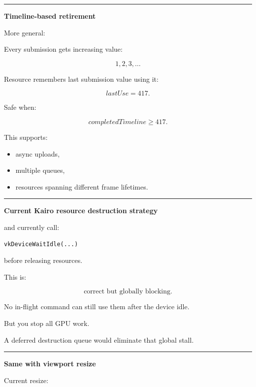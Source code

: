 \begin{center}\rule{0.5\linewidth}{0.5pt}\end{center}

\textbf{Timeline-based retirement}

More general:

Every submission gets increasing value:

\[
1,2,3,\dots
\]

Resource remembers last submission value using it:

\[
lastUse=417.
\]

Safe when:

\[
completedTimeline\ge417.
\]

This supports:

\begin{itemize}
\tightlist
\item
  async uploads,
\item
  multiple queues,
\item
  resources spanning different frame lifetimes.
\end{itemize}

\begin{center}\rule{0.5\linewidth}{0.5pt}\end{center}

\textbf{Current Kairo resource destruction strategy}

 and  currently call:

\begin{verbatim}
vkDeviceWaitIdle(...)
\end{verbatim}

before releasing resources.

This is:

\[
\boxed{\text{correct but globally blocking}.}
\]

No in-flight command can still use them after the device idle.

But you stop all GPU work.

A deferred destruction queue would eliminate that global stall.

\begin{center}\rule{0.5\linewidth}{0.5pt}\end{center}

\textbf{Same with viewport resize}

Current resize:


